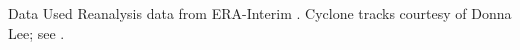 \begin{block}{Data Used}
    Reanalysis data from ERA-Interim \cite{Dee2011}.
    Cyclone tracks courtesy of Donna Lee; see \cite{Booth2015}.
\end{block}
